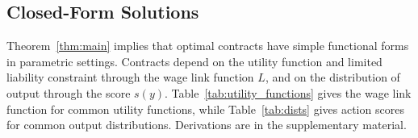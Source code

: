 \subsection{Closed-Form Solutions}
\label{sec:calculus}
Theorem~\ref{thm:main} implies that optimal contracts have simple functional forms in parametric settings. Contracts depend on the utility function and limited liability constraint through the wage link function $L$, and on the distribution of output through the score $s(y)$. Table~\ref{tab:utility_functions} gives the wage link function for common utility functions, while Table~\ref{tab:dists} gives action scores for common output distributions. Derivations are in the supplementary material.

 


